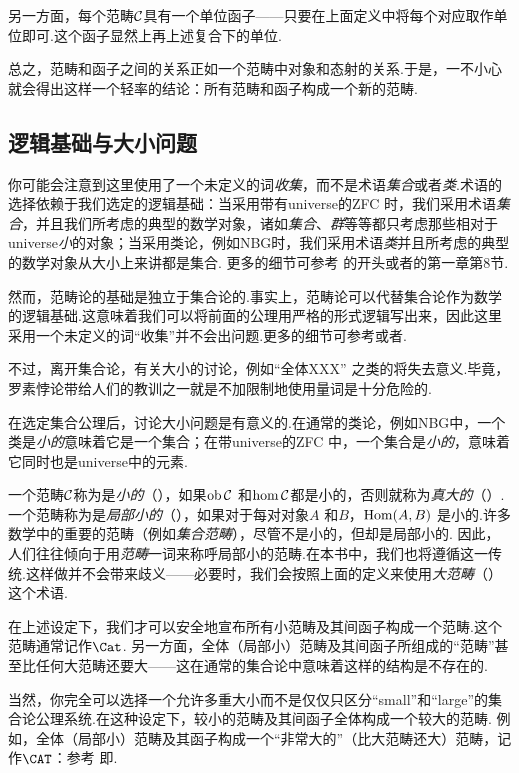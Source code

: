   另一方面，每个范畴${\cal C}$具有一个单位函子——只要在上面定义中将每个对应取作单位即可.这个函子显然上再上述复合下的单位.

  总之，范畴和函子之间的关系正如一个范畴中对象和态射的关系.于是，一不小心就会得出这样一个轻率的结论：所有范畴和函子构成一个新的范畴.

\subsection{逻辑基础与大小问题}
    你可能会注意到这里使用了一个未定义的词\emph{收集}，而不是术语\emph{集合}或者\emph{类}.术语的选择依赖于我们选定的逻辑基础：当采用带有universe的ZFC 时，我们采用术语\emph{集合}，并且我们所考虑的典型的数学对象，诸如\emph{集合}、\emph{群}等等都只考虑那些相对于universe\emph{小}的对象；当采用类论，例如NBG时，我们采用术语\emph{类}并且所考虑的典型的数学对象从大小上来讲都是集合. 更多的细节可参考\cite{borceux} 的开头或者\cite{awodey2010category}的第一章第8节.

    然而，范畴论的基础是独立于集合论的.事实上，范畴论可以代替集合论作为数学的逻辑基础.这意味着我们可以将前面的公理用严格的形式逻辑写出来，因此这里采用一个未定义的词“收集”并不会出问题.更多的细节可参考\nlab 或者\cite{lane1998categories}.

    不过，离开集合论，有关大小的讨论，例如“全体XXX” 之类的将失去意义.毕竟，罗素悖论带给人们的教训之一就是不加限制地使用量词是十分危险的.

    在选定集合公理后，讨论大小问题是有意义的.在通常的类论，例如NBG中，一个类是\emph{小的}意味着它是一个集合；在带universe的ZFC 中，一个集合是\emph{小的}，意味着它同时也是universe中的元素.

    一个范畴${\cal C}$称为是\emph{小的}（），如果$\operatorname{ob}{\cal C}$ 和$\hom{\cal C}$都是小的，否则就称为\emph{真大的}（）.
    一个范畴称为是\emph{局部小的}（），如果对于每对对象$A$ 和$B$，$\operatorname{Hom}(A, B)$ 是小的.许多数学中的重要的范畴（例如\emph{集合范畴}），尽管不是小的，但却是局部小的.
    因此，人们往往倾向于用\emph{范畴}一词来称呼局部小的范畴.在本书中，我们也将遵循这一传统.这样做并不会带来歧义——必要时，我们会按照上面的定义来使用\emph{大范畴}（）这个术语.

    在上述设定下，我们才可以安全地宣布所有小范畴及其间函子构成一个范畴.这个范畴通常记作$\Cat$.
    另一方面，全体（局部小）范畴及其间函子所组成的“范畴”甚至比任何大范畴还要大——这在通常的集合论中意味着这样的结构是不存在的.

    当然，你完全可以选择一个允许多重大小而不是仅仅只区分“small”和“large”的集合论公理系统.在这种设定下，较小的范畴及其间函子全体构成一个较大的范畴. 例如，全体（局部小）范畴及其函子构成一个“非常大的”（比大范畴还大）范畴，记作$\CAT$：参考
    \hrefacc 即\cite{acc}.

